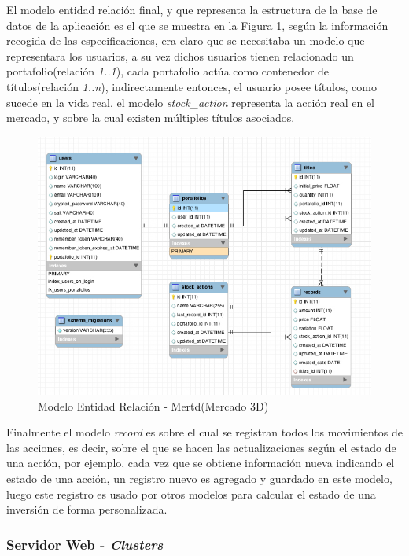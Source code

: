 \documentclass[twocolumn]{article}
\begin{document}
El modelo entidad relación final, y que representa la estructura de la base de datos de la aplicación es el que se muestra en la Figura \ref{fig:erd}, según la información recogida de las especificaciones, era claro que se necesitaba un modelo que representara los usuarios, a su vez dichos usuarios tienen relacionado un portafolio(relación \emph{1..1}), cada portafolio actúa como contenedor de títulos(relación \emph{1..n}), indirectamente entonces, el usuario posee títulos, como sucede en la vida real, el modelo \emph{stock\_action} representa la acción real en el mercado, y sobre la cual existen múltiples títulos asociados.

\begin{figure}[h]
	\centering
		\includegraphics[scale=0.35]{erb_mertd.jpg}
		\caption{Modelo Entidad Relación - Mertd(Mercado 3D)}
	\label{fig:erd}
\end{figure}

Finalmente el modelo \emph{record} es sobre el cual se registran todos los movimientos de las acciones, es decir, sobre el que se hacen las actualizaciones según el estado de una acción, por ejemplo, cada vez que se obtiene información nueva indicando el estado de una acción, un registro nuevo es agregado y guardado en este modelo, luego este registro es usado por otros modelos para calcular el estado de una inversión de forma personalizada.\\

\subsubsection{Servidor Web - \emph{Clusters}}
\end{document}
